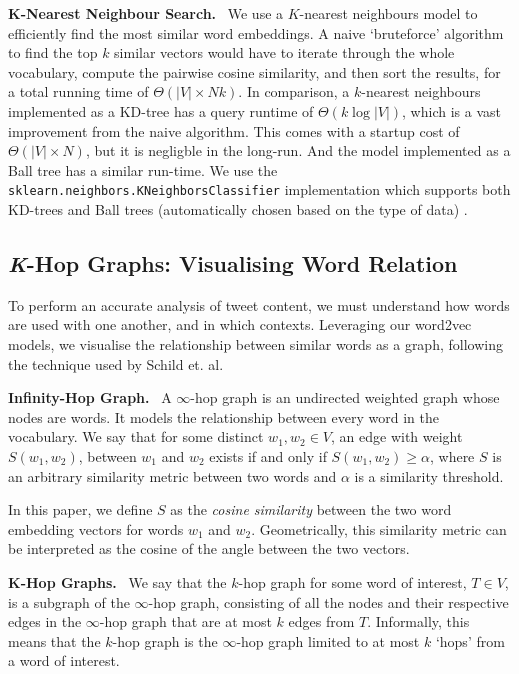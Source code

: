 \documentclass{paper}
\newcommand{\inlineSection}[1]{\vspace{0.5em}\noindent\textbf{#1.}~}
\begin{document}
\inlineSection{$\bm{K}$-Nearest Neighbour Search} We use a $K$-nearest neighbours model to efficiently find the most similar word embeddings. A naive `bruteforce' algorithm to find the top $k$ similar vectors would have to iterate through the whole vocabulary, compute the pairwise cosine similarity, and then sort the results, for a total running time of $\Theta(|V|\times Nk)$. In comparison, a $k$-nearest neighbours implemented as a KD-tree has a query runtime of $\Theta(k\log{|V|})$, which is a vast improvement from the naive algorithm. This comes with a startup cost of $\Theta(|V|\times N)$, but it is negligble in the long-run. And the model implemented as a Ball tree has a similar run-time. We use the \texttt{sklearn.neighbors.KNeighborsClassifier} implementation which supports both KD-trees and Ball trees (automatically chosen based on the type of data) \cite{scikit-learn}.

\subsection{\textit{K}-Hop Graphs: Visualising Word Relation}

To perform an accurate analysis of tweet content, we must understand how words are used with one another, and in which contexts. Leveraging our word2vec models, we visualise the relationship between similar words as a graph, following the technique used by Schild et. al.

\inlineSection{Infinity-Hop Graph}
A $\infty$-hop graph is an undirected weighted graph whose nodes are words. It models the relationship between every word in the vocabulary. We say that for some distinct $w_1,w_2\in V$, an edge with weight $S(w_1,w_2)$, between $w_1$ and $w_2$ exists if and only if $S(w_1,w_2)\geq\alpha$, where $S$ is an arbitrary similarity metric between two words and $\alpha$ is a similarity threshold.

In this paper, we define $S$ as the \textit{cosine similarity} between the two word embedding vectors for words $w_1$ and $w_2$. Geometrically, this similarity metric can be interpreted as the cosine of the angle between the two vectors.

\inlineSection{$\bm{K}$-Hop Graphs} We say that the $k$-hop graph for some word of interest, $T\in V$, is a subgraph of the $\infty$-hop graph, consisting of all the nodes and their respective edges in the $\infty$-hop graph that are at most $k$ edges from $T$. Informally, this means that the $k$-hop graph is the $\infty$-hop graph limited to at most $k$ `hops' from a word of interest.
\end{document}
